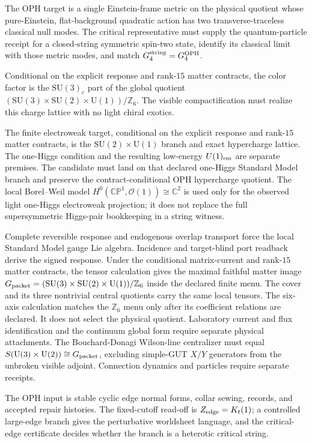 \documentclass[11pt]{article}
\theoremstyle{remark}
\theoremstyle{plain}
\newcommand{\OPH}{\mathrm{OPH}}
\newcommand{\SU}{\mathrm{SU}}
\newcommand{\U}{\mathrm{U}}
\newcommand{\Z}{\mathbb Z}
\begin{document}
\begin{description}[leftmargin=2em]
\item[Gravity.]
The OPH target is a single Einstein-frame metric on the physical quotient whose pure-Einstein,
flat-background quadratic action has two transverse-traceless classical null modes. The critical
representative must supply the quantum-particle receipt for a closed-string symmetric spin-two state,
identify its classical limit with those metric modes, and match
\(G_4^{\rm string}=G_4^{\OPH}\).

\item[Strong force.]
Conditional on the explicit response and rank-\(15\) matter contracts, the color factor is the
\(\SU(3)_c\) part of the global quotient
\((\SU(3)\times\SU(2)\times\U(1))/\Z_6\). The visible compactification must realize this charge
lattice with no light chiral exotics.

\item[Weak and electromagnetic forces.]
The finite electroweak target, conditional on the explicit response and rank-\(15\) matter
contracts, is the \(\SU(2)\times\U(1)\) branch and exact hypercharge lattice. The one-Higgs
condition and the resulting low-energy \(U(1)_{\rm em}\) are separate premises. The
candidate must land on that declared one-Higgs Standard Model branch and preserve the
contract-conditional OPH hypercharge quotient.
The local Borel--Weil model \(H^0(\mathbb{CP}^1,\mathcal O(1))\cong\mathbb C^2\) is used only for
the observed light one-Higgs electroweak projection; it does not replace the full supersymmetric
Higgs-pair bookkeeping in a string witness.

\item[Standard Model local gauge algebra and conditional matter image.]
Complete reversible response and endogenous overlap transport force the
local Standard Model gauge Lie algebra. Incidence and target-blind port readback derive the
signed response. Under the conditional matrix-current and rank-\(15\) matter
contracts, the tensor calculation gives the maximal faithful matter image
\(G_{\rm packet}=(\SU(3)\times\SU(2)\times\U(1))/\Z_6\) inside the declared
finite menu. The cover and its three nontrivial central quotients carry the
same local tensors. The six-axis calculation matches the \(\Z_6\) menu only
after its coefficient relations are declared. It does not select the
physical quotient. Laboratory current and flux
identification and the continuum global form require separate physical
attachments. The Bouchard-Donagi Wilson-line centralizer must equal
\(S(\U(3)\times\U(2))\cong G_{\rm packet}\), excluding simple-GUT \(X/Y\) generators from the
unbroken visible adjoint. Connection dynamics and particles require separate receipts.

\item[Effective string theory.]
The OPH input is stable cyclic edge normal forms, collar sewing, records, and accepted repair
histories. The fixed-cutoff read-off is \(Z_{\rm edge}=K_t(1)\); a controlled large-edge branch
gives the perturbative worldsheet language, and the critical-edge certificate decides whether the
branch is a heterotic critical string.
\end{description}
\end{document}
